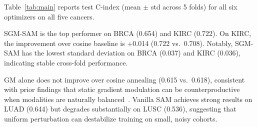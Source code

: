 \documentclass[runningheads]{llncs}
\begin{document}
\begin{table}[t]
\centering
\caption{Test C-index (mean $\pm$ std, 5-fold CV). \textbf{Bold} = best per cancer. All methods in the top block share the same architecture and hyperparameters; only the optimizer differs. Bottom block shows published SOTA references (different architectures).}
\label{tab:main}

\end{table}

Table~\ref{tab:main} reports test C-index (mean $\pm$ std across 5
folds) for all six optimizers on all five cancers.

SGM-SAM is the top performer on BRCA (0.654) and KIRC (0.722). On KIRC, the improvement over
cosine baseline is +0.014 (0.722 vs.\ 0.708). Notably, SGM-SAM has the
lowest standard deviation on BRCA (0.037) and KIRC (0.036),
indicating stable cross-fold performance.

GM alone does not improve over cosine annealing (0.615 vs.\
0.618), consistent with prior findings that static gradient
modulation can be counterproductive when modalities are naturally
balanced~\cite{peng2022ogm}. Vanilla SAM achieves strong results on
LUAD (0.644) but degrades substantially on LUSC (0.536), suggesting
that uniform perturbation can destabilize training on small, noisy
cohorts.
\end{document}
